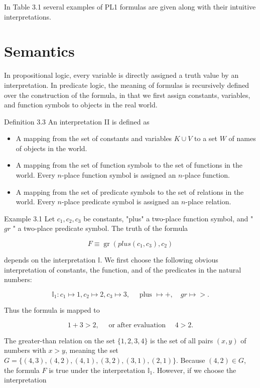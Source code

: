 \documentclass[10pt]{book}
\begin{document}
In Table 3.1 several examples of PL1 formulas are given along with their intuitive interpretations.

\section{Semantics}
In propositional logic, every variable is directly assigned a truth value by an interpretation. In predicate logic, the meaning of formulas is recursively defined over the construction of the formula, in that we first assign constants, variables, and function symbols to objects in the real world.

Definition 3.3 An interpretation II is defined as

\begin{itemize}
  \item A mapping from the set of constants and variables $K \cup V$ to a set $W$ of names of objects in the world.
  \item A mapping from the set of function symbols to the set of functions in the world. Every $n$-place function symbol is assigned an $n$-place function.
  \item A mapping from the set of predicate symbols to the set of relations in the world. Every $n$-place predicate symbol is assigned an $n$-place relation.
\end{itemize}

Example 3.1 Let $c_{1}, c_{2}, c_{3}$ be constants, "plus" a two-place function symbol, and " $g r$ " a two-place predicate symbol. The truth of the formula

$$
F \equiv \operatorname{gr}\left(p l u s\left(c_{1}, c_{3}\right), c_{2}\right)
$$

depends on the interpretation $\mathbb{I}$. We first choose the following obvious interpretation of constants, the function, and of the predicates in the natural numbers:

$$
\mathbb{I}_{1}: c_{1} \mapsto 1, c_{2} \mapsto 2, c_{3} \mapsto 3, \quad \text { plus } \mapsto+, \quad g r \mapsto>.
$$

Thus the formula is mapped to

$$
1+3>2, \quad \text { or after evaluation } \quad 4>2 .
$$

The greater-than relation on the set $\{1,2,3,4\}$ is the set of all pairs $(x, y)$ of numbers with $x>y$, meaning the set $G=\{(4,3),(4,2),(4,1),(3,2),(3,1),(2,1)\}$. Because $(4,2) \in G$, the formula $F$ is true under the interpretation $\mathbb{I}_{1}$. However, if we choose the interpretation
\end{document}
